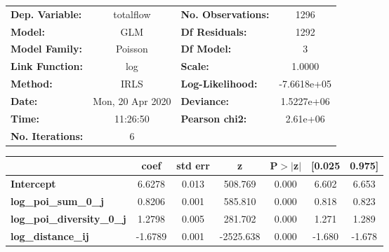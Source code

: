\begin{center}
\begin{tabular}{lclc}
\toprule
\textbf{Dep. Variable:}            &    totalflow     & \textbf{  No. Observations:  } &      1296    \\
\textbf{Model:}                    &       GLM        & \textbf{  Df Residuals:      } &      1292    \\
\textbf{Model Family:}             &     Poisson      & \textbf{  Df Model:          } &         3    \\
\textbf{Link Function:}            &       log        & \textbf{  Scale:             } &     1.0000   \\
\textbf{Method:}                   &       IRLS       & \textbf{  Log-Likelihood:    } & -7.6618e+05  \\
\textbf{Date:}                     & Mon, 20 Apr 2020 & \textbf{  Deviance:          } &  1.5227e+06  \\
\textbf{Time:}                     &     11:26:50     & \textbf{  Pearson chi2:      } &   2.61e+06   \\
\textbf{No. Iterations:}           &        6         & \textbf{                     } &              \\
\bottomrule
\end{tabular}
\begin{tabular}{lcccccc}
                                   & \textbf{coef} & \textbf{std err} & \textbf{z} & \textbf{P$> |$z$|$} & \textbf{[0.025} & \textbf{0.975]}  \\
\midrule
\textbf{Intercept}                 &       6.6278  &        0.013     &   508.769  &         0.000        &        6.602    &        6.653     \\
\textbf{log\_poi\_sum\_0\_j}       &       0.8206  &        0.001     &   585.810  &         0.000        &        0.818    &        0.823     \\
\textbf{log\_poi\_diversity\_0\_j} &       1.2798  &        0.005     &   281.702  &         0.000        &        1.271    &        1.289     \\
\textbf{log\_distance\_ij}         &      -1.6789  &        0.001     & -2525.638  &         0.000        &       -1.680    &       -1.678     \\
\bottomrule
\end{tabular}
\end{center}